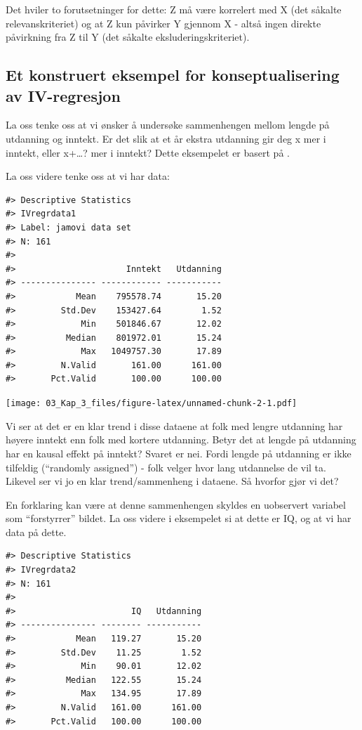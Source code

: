 \documentclass[
]{article}
\begin{document}
Det hviler to forutsetninger for dette: Z må være korrelert med X (det såkalte relevanskriteriet) og at Z kun påvirker Y gjennom X - altså ingen direkte påvirkning fra Z til Y (det såkalte eksluderingskriteriet).

\hypertarget{et-konstruert-eksempel-for-konseptualisering-av-iv-regresjon}{%
\subsection{Et konstruert eksempel for konseptualisering av IV-regresjon}\label{et-konstruert-eksempel-for-konseptualisering-av-iv-regresjon}}

La oss tenke oss at vi ønsker å undersøke sammenhengen mellom lengde på utdanning og inntekt. Er det slik at et år ekstra utdanning gir deg x mer i inntekt, eller x+\ldots? mer i inntekt? Dette eksempelet er basert på \citet{mastenCausalInferenceBootcamp2015}.

La oss videre tenke oss at vi har data:

\begin{verbatim}
#> Descriptive Statistics  
#> IVregrdata1  
#> Label: jamovi data set  
#> N: 161  
#> 
#>                      Inntekt   Utdanning
#> --------------- ------------ -----------
#>            Mean    795578.74       15.20
#>         Std.Dev    153427.64        1.52
#>             Min    501846.67       12.02
#>          Median    801972.01       15.24
#>             Max   1049757.30       17.89
#>         N.Valid       161.00      161.00
#>       Pct.Valid       100.00      100.00
\end{verbatim}

\texttt{[image: 03\_Kap\_3\_files/figure-latex/unnamed-chunk-2-1.pdf]}

Vi ser at det er en klar trend i disse dataene at folk med lengre utdanning har høyere inntekt enn folk med kortere utdanning. Betyr det at lengde på utdanning har en kausal effekt på inntekt? Svaret er nei. Fordi lengde på utdanning er ikke tilfeldig (``randomly assigned'') - folk velger hvor lang utdannelse de vil ta. Likevel ser vi jo en klar trend/sammenheng i dataene. Så hvorfor gjør vi det?

En forklaring kan være at denne sammenhengen skyldes en uobservert variabel som ``forstyrrer'' bildet. La oss videre i eksempelet si at dette er IQ, og at vi har data på dette.

\begin{verbatim}
#> Descriptive Statistics  
#> IVregrdata2  
#> N: 161  
#> 
#>                       IQ   Utdanning
#> --------------- -------- -----------
#>            Mean   119.27       15.20
#>         Std.Dev    11.25        1.52
#>             Min    90.01       12.02
#>          Median   122.55       15.24
#>             Max   134.95       17.89
#>         N.Valid   161.00      161.00
#>       Pct.Valid   100.00      100.00
\end{verbatim}
\end{document}
